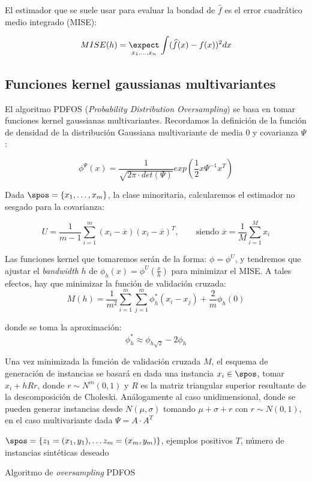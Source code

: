 El estimador que se suele usar para evaluar la bondad de $\widehat{f}$ es el error cuadrático medio integrado (MISE):

\[MISE(h) = \underset{x_1, \ldots, x_n}{\expect} \int (\widehat{f}(x) - f(x))^2 dx\]

\subsection{Funciones kernel gaussianas multivariantes}
El algoritmo PDFOS (\textit{Probability Distribution Oversampling}) se basa en tomar funciones kernel gaussianas multivariantes.
Recordamos la definición de la función de densidad de la distribución Gaussiana multivariante de media $0$ y covarianza $\Psi$:

\[\phi^{\Psi}(x) = \frac{1}{\sqrt{2\pi \cdot det(\Psi)}} exp\left(\frac{1}{2} x \Psi^{-1} x^T \right)\]

Dada $\spos = \{x_1, \ldots, x_m\}$, la clase minoritaria, calcularemos el estimador no sesgado para la covarianza:

\[U = \frac{1}{m-1} \sum_{i=1}^m (x_i - \overline{x})(x_i - \overline{x})^T, 
  \qquad \textrm{siendo } \overline{x} = \frac{1}{M}\sum_{i=1}^M x_i\]
  
Las funciones kernel que tomaremos serán de la forma: $\phi = \phi^{U}$, y tendremos que ajustar el \textit{bandwidth} $h$ de
$\phi_h(x) = \phi^U\left(\frac{x}{h}\right)$ para minimizar el MISE. A tales efectos, hay que minimizar la función de validación
cruzada:
\[M(h) = \frac{1}{m^2} \sum_{i=1}^m \sum_{j=1}^m \phi_h^{\ast} (x_i - x_j) + \frac{2}{m} \phi_h(0)\]

donde se toma la aproximación:
\[\phi_h^{\ast} \approx \phi_{h\sqrt{2}} - 2\phi_h\]

Una vez minimizada la función de validación cruzada $M$, el esquema de generación de instancias se basará en dada una instancia
$x_i \in \spos$, tomar $x_i + h R r$, donde $r\sim N^m(0,1)$ y $R$ es la matriz triangular superior resultante de la descomposición
de Choleski. Análogamente al caso unidimensional, donde se pueden generar instancias desde $N(\mu, \sigma)$ tomando $\mu + \sigma + r$
con $r\sim N(0,1)$, en el caso multivariante dada $\Psi =  A \cdot A^T$

\begin{algorithm}[H]
\begin{algorithmic}[1]
  \REQUIRE $\spos = \{z_1=(x_1, y_1), \ldots z_m=(x_m, y_m)\}$, ejemplos positivos
  \REQUIRE $T$, número de instancias sintéticas deseado
  \NEWLINE
  \ENDFOR
  \NEWLINE
\end{algorithmic}
\caption{Algoritmo de \textit{oversampling} PDFOS}
\label{alg:pdfos}
\end{algorithm}


